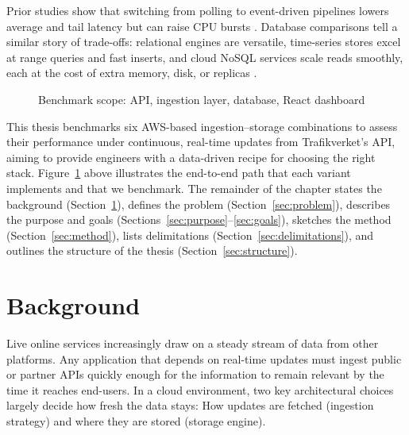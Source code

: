 \documentclass[nomenclature, english, biblatex]{kththesis}
\numberwithin{listing}{chapter}
\begin{document}
\noindent
Prior studies show that switching from polling to event-driven pipelines lowers average and tail latency but can raise CPU bursts \cite{Trindade2021EDAImpact}. 
Database comparisons tell a similar story of trade-offs: relational engines are versatile, time-series stores excel at range queries and fast inserts, and cloud NoSQL services scale reads smoothly, each at the cost of extra memory, disk, or replicas \cite{Heldt2021SciTS,Grzesik2020EdgeIoTBenchmark,Vergara2021PerformanceTSDB}.

\begin{figure}[htbp]
 \centering
 \caption{Benchmark scope: API, ingestion layer, database, React dashboard}
 \label{fig:pipeline}
\end{figure}

\noindent
This thesis benchmarks six \gls{AWS}-based ingestion–storage combinations to assess their performance under continuous, real-time updates from Trafikverket's API, aiming to provide engineers with a data-driven recipe for choosing the right stack. Figure~\ref{fig:pipeline} above illustrates the end-to-end path that each variant implements and that we benchmark.
The remainder of the chapter states the background (Section~\ref{sec:background}), defines the problem (Section~\ref{sec:problem}), describes the purpose and goals (Sections~\ref{sec:purpose}–\ref{sec:goals}), sketches the method (Section~\ref{sec:method}), lists delimitations (Section~\ref{sec:delimitations}), and outlines the structure of the thesis (Section~\ref{sec:structure}).




\section{Background}
\label{sec:background}
Live online services increasingly draw on a steady stream of data from other platforms. Any application that depends on real-time updates must ingest public or partner \glspl{API} quickly enough for the information to remain relevant by the time it reaches end-users. In a cloud environment, two key architectural choices largely decide how fresh the data stays: How updates are fetched (ingestion strategy) and where they are stored (storage engine).
\end{document}
